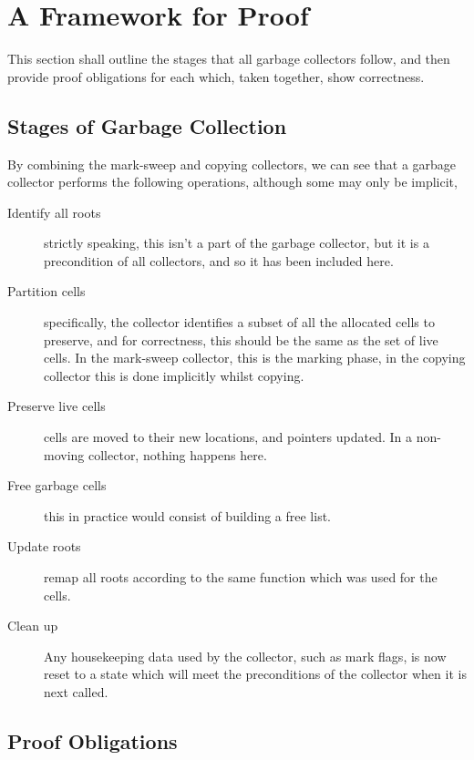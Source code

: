 \section{A Framework for Proof}
\label{sec:gc-framework}

This section shall outline the stages that all garbage collectors
follow, and then provide proof obligations for each which, taken
together, show correctness.

\subsection{Stages of Garbage Collection}
\label{sec:gc-framework-stages}

By combining the mark-sweep and copying collectors, we can see that
a garbage collector performs the following operations, although some
may only be implicit,

\begin{description}
  \item[Identify all roots] strictly speaking, this isn't a part of
    the garbage collector, but it is a precondition of all collectors,
    and so it has been included here.

  \item[Partition cells] specifically, the collector identifies a
    subset of all the allocated cells to preserve, and for
    correctness, this should be the same as the set of live cells. In
    the mark-sweep collector, this is the marking phase, in the
    copying collector this is done implicitly whilst copying.

  \item[Preserve live cells] cells are moved to their new locations,
    and pointers updated. In a non-moving collector, nothing happens
    here.

  \item[Free garbage cells] this in practice would consist of building
    a free list.

  \item[Update roots] remap all roots according to the same function
    which was used for the cells.

  \item[Clean up] Any housekeeping data used by the collector, such as
    mark flags, is now reset to a state which will meet the
    preconditions of the collector when it is next called.
\end{description}

\subsection{Proof Obligations}
\label{sec:gc-framework-obligations}

